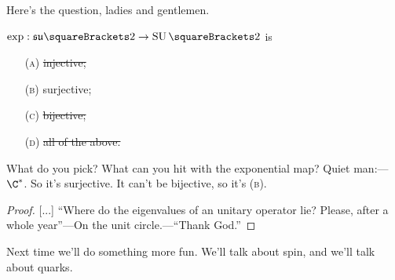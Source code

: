 \documentclass[10pt, a4paper, twoside]{lecturenotes}
\begin{document}
\begin{lecture}[date=2013-04-25]
Here's the question, ladies and gentlemen.
\begin{proposition}
$\FunctionSpec{\exp}{\LAsutwo}{\SpecialUnitaryGroup\of 2}$ is\begin{itemize}
\item[(\textsc{a})]\st{injective;}
\item[(\textsc{b})]surjective;
\item[(\textsc{c})]\st{bijective;}
\item[(\textsc{d})]\st{all of the above.}
\end{itemize}
What do you pick? What can you hit with the exponential map? Quiet man:---$\NonZero\C$. So it's surjective. It can't be bijective, so it's (\textsc{b}). 
\begin{proof}{}[...]
``Where do the eigenvalues of an unitary operator lie? Please, after a whole year''---On the unit circle.---``Thank God.''
\end{proof}
\end{proposition}

Next time we'll do something more fun. We'll talk about spin, and we'll talk about quarks.
\end{lecture}
\end{document}
